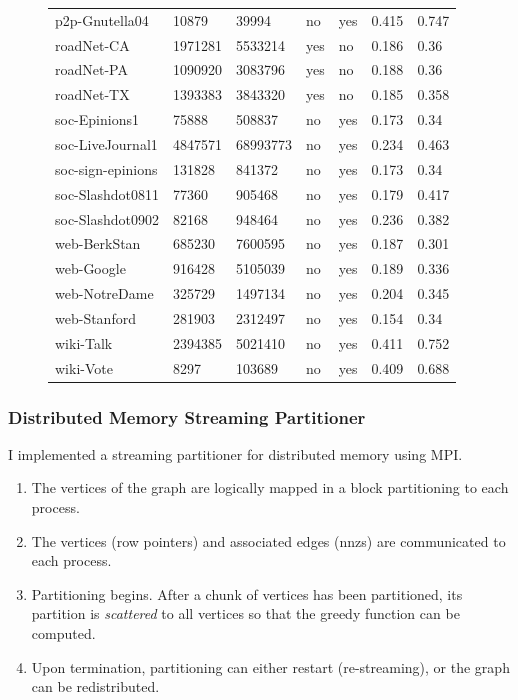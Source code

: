 \documentclass[11pt]{article}
\begin{document}
\begin{figure}
{\begin{tabular}{ *7l }
p2p-Gnutella04 & 10879 & 39994 & no & yes & 0.415&0.747\\ 
roadNet-CA & 1971281 & 5533214 & yes & no & 0.186&0.36\\ 
roadNet-PA & 1090920 & 3083796 & yes & no & 0.188&0.36\\ 
roadNet-TX & 1393383 & 3843320 & yes & no & 0.185&0.358\\ 
soc-Epinions1 & 75888 & 508837 & no & yes & 0.173&0.34\\ 
soc-LiveJournal1 & 4847571 & 68993773 & no & yes &0.234& 0.463\\ 
soc-sign-epinions & 131828 & 841372 & no & yes &0.173&0.34\\ 
soc-Slashdot0811 & 77360 & 905468 & no & yes &0.179&0.417\\ 
soc-Slashdot0902 & 82168 & 948464 & no & yes &0.236&0.382\\ 
web-BerkStan & 685230 & 7600595 & no & yes &0.187&0.301\\ 
web-Google & 916428 & 5105039 & no & yes &0.189&0.336\\ 
web-NotreDame & 325729 & 1497134 & no & yes &0.204&0.345\\ 
web-Stanford & 281903 & 2312497 & no & yes &0.154&0.34\\ 
wiki-Talk & 2394385 & 5021410 & no & yes &0.411&0.752\\ 
wiki-Vote  & 8297 & 103689 & no & yes &0.409&0.688\\ 
 \hline
\end{tabular}\par
}
\end{figure}

\subsubsection{Distributed Memory Streaming Partitioner}
I implemented a streaming partitioner for distributed memory using MPI.

\begin{enumerate}
\item The vertices of the graph are logically mapped in a block partitioning to each process.
\item The vertices (row pointers) and associated edges (nnzs) are communicated to each process.
\item Partitioning begins. After a chunk of vertices has been partitioned, its partition is \textit{scattered} to all vertices so that the greedy function can be computed.
\item Upon termination, partitioning can either restart (re-streaming), or the graph can be redistributed.
\end{enumerate}
\end{document}

